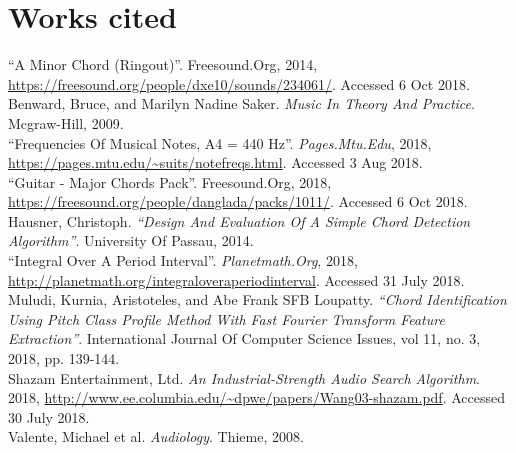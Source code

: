 \documentclass{article}
\begin{document}
\section*{Works cited}
\begin{hangparas}{.25in}{1}

``A Minor Chord (Ringout)''. Freesound.Org, 2014, 
\url{https://freesound.org/people/dxe10/sounds/234061/}. Accessed 6 Oct 2018.\\

Benward, Bruce, and Marilyn Nadine Saker. 
\textit{Music In Theory And Practice}. Mcgraw-Hill, 2009. \\

``Frequencies Of Musical Notes, A4 = 440 Hz''. \textit{Pages.Mtu.Edu}, 2018, 
\url{https://pages.mtu.edu/~suits/notefreqs.html}. Accessed 3 Aug 2018. \\

``Guitar - Major Chords Pack''. Freesound.Org, 2018, 
\url{https://freesound.org/people/danglada/packs/1011/}. Accessed 6 Oct 2018. \\

Hausner, Christoph. \textit{``Design And Evaluation Of A Simple Chord 
Detection Algorithm''}. University Of Passau, 2014. \\

``Integral Over A Period Interval''. \textit{Planetmath.Org}, 2018, 
\url{http://planetmath.org/integraloveraperiodinterval}. Accessed 31 July 2018.
\\

Muludi, Kurnia, Aristoteles, and Abe Frank SFB Loupatty. \textit{``Chord 
Identification Using Pitch Class Profile Method With Fast Fourier Transform 
Feature Extraction''}. International Journal Of Computer Science Issues, vol 
11, no. 3, 2018, pp. 139-144. \\

Shazam Entertainment, Ltd. \textit{An Industrial-Strength Audio Search 
Algorithm}. 2018, 
\url{http://www.ee.columbia.edu/~dpwe/papers/Wang03-shazam.pdf}. 
Accessed 30 July 2018. \\

Valente, Michael et al. \textit{Audiology}. Thieme, 2008. \\

\end{hangparas}
\end{document}
